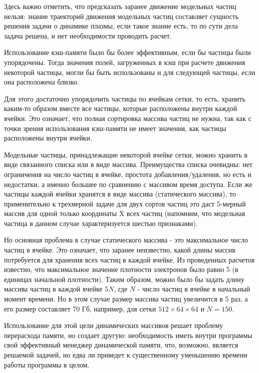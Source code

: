 Здесь важно отметить, что предсказать заранее движение модельных частиц нельзя: знание траекторий  движения модельных частиц составляет сущность решения задачи о  динамике плазмы, если такое знание есть, то по сути дела задача решена, и нет необходимости проводить расчет.


Использование кэш-памяти было бы более эффективным, если бы частицы были упорядочены. Тогда значения полей, загруженных в кэш при расчете движения некоторой частицы, могли бы быть использованы и для следующей частицы, если она расположена близко. 

Для этого достаточно упорядочить частицы по ячейкам сетки, то есть, хранить каким-то образом вместе все частицы, которые расположены внутри каждой ячейки. Это означает, что полная сортировка массива частиц не нужна, так как с точки зрения использования кэш-памяти не имеет значения, как частицы расположены внутри ячейки. 

Модельные частицы, принадлежащие некоторой ячейке сетки, можно хранить в виде связанного списка или в виде массива. Преимущества списка очевидны: нет ограничения на число частиц в ячейке, простота добавления/удаления, но есть и недостатки, а именно большее по сравнению с массивом время доступа. Если же частицы каждой ячейки хранятся в виде массива (статического массива), то применительно к трехмерной задаче для двух сортов частиц это даст 5-мерный массив для одной только координаты X всех частиц (напомним, что модельная частица в данном случае характеризуется шестью признаками). 

Но основная проблема в случае статического массива - это максимальное число частиц в ячейке. Это означает, что заранее неизвестно, какой длины массив потребуется для хранения всех частиц в каждой ячейке. Из проведенных расчетов известно, что максимальное значение плотности электронов было равно 5 (в единицах начальной плотности). Таким образом, можно было бы задать длину массива частиц в каждой ячейке $5N$, где $N$ - число частиц в ячейке в начальный момент времени. Но в этом случае размер массива частиц увеличится в 5 раз, а его размер составляет 70 Гб, например, для сетки $512\times64\times64$ и $N = 150$. 

Использование для этой цели динамических массивов решает проблему перерасхода памяти, но создает другую: необходимость иметь внутри программы свой эффективный менеджер динамической памяти, что, возможно, является решаемой задачей, но едва ли приведет к существенному уменьшению времени работы программы в целом. 


